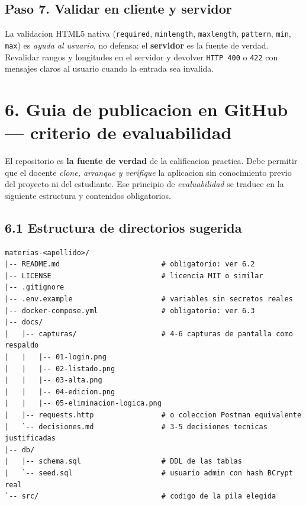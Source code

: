 \documentclass[10pt,a4paper]{article}
\begin{document}
\subsection*{Paso 7. Validar en cliente y servidor}
La validacion HTML5 nativa (\texttt{required}, \texttt{minlength}, \texttt{maxlength}, \texttt{pattern}, \texttt{min}, \texttt{max}) es \emph{ayuda al usuario}, no defensa: el \textbf{servidor} es la fuente de verdad. Revalidar rangos y longitudes en el servidor y devolver \texttt{HTTP 400} o \texttt{422} con mensajes claros al usuario cuando la entrada sea invalida.

\section*{6. Guia de publicacion en GitHub --- criterio de evaluabilidad}
El repositorio es \textbf{la fuente de verdad} de la calificacion practica. Debe permitir que el docente \emph{clone, arranque y verifique} la aplicacion sin conocimiento previo del proyecto ni del estudiante. Ese principio de \emph{evaluabilidad} se traduce en la siguiente estructura y contenidos obligatorios.

\subsection*{6.1 Estructura de directorios sugerida}
\begin{lstlisting}[style=shellestilo]
materias-<apellido>/
|-- README.md                        # obligatorio: ver 6.2
|-- LICENSE                          # licencia MIT o similar
|-- .gitignore
|-- .env.example                     # variables sin secretos reales
|-- docker-compose.yml               # obligatorio: ver 6.3
|-- docs/
|   |-- capturas/                    # 4-6 capturas de pantalla como respaldo
|   |   |-- 01-login.png
|   |   |-- 02-listado.png
|   |   |-- 03-alta.png
|   |   |-- 04-edicion.png
|   |   |-- 05-eliminacion-logica.png
|   |-- requests.http                # o coleccion Postman equivalente
|   `-- decisiones.md                # 3-5 decisiones tecnicas justificadas
|-- db/
|   |-- schema.sql                   # DDL de las tablas
|   `-- seed.sql                     # usuario admin con hash BCrypt real
`-- src/                             # codigo de la pila elegida
\end{lstlisting}
\end{document}
